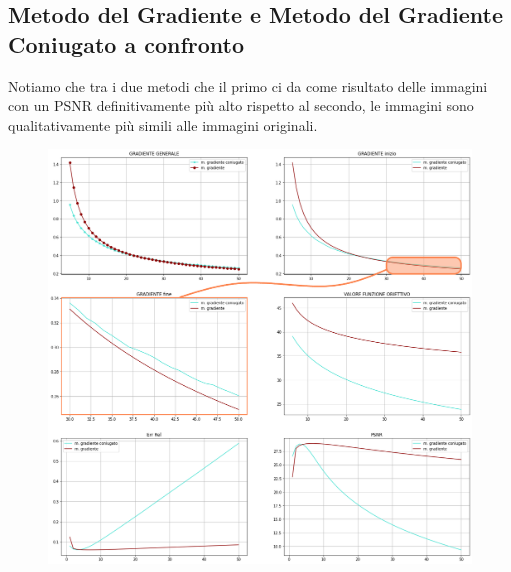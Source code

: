 \subsection{Metodo del Gradiente e Metodo del Gradiente Coniugato a confronto}

Notiamo che tra i due metodi che il primo ci da come risultato delle immagini con un PSNR 
definitivamente più alto rispetto al secondo, le immagini sono qualitativamente più simili 
alle immagini originali. 

\begin{figure}[H]
    \centering
    \includegraphics[width=\textwidth]{output/MGCvsMG-enph.png}
    \label{fig:MGCvsMG}
\end{figure}